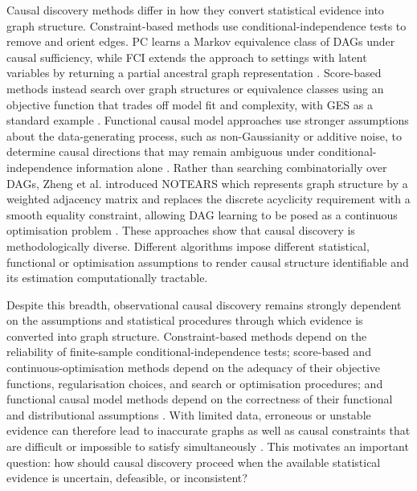 Causal discovery methods differ in how they convert statistical evidence into graph structure. Constraint-based methods use conditional-independence tests to remove and orient edges. PC learns a Markov equivalence class of DAGs under causal sufficiency, while FCI extends the approach to settings with latent variables by returning a partial ancestral graph representation \cite{spirtes2000causation, glymour2019review, colombo2014order}. Score-based methods instead search over graph structures or equivalence classes using an objective function that trades off model fit and complexity, with GES as a standard example \cite{meek1997graphical, chickering2002optimal}. Functional causal model approaches use stronger assumptions about the data-generating process, such as non-Gaussianity or additive noise, to determine causal directions that may remain ambiguous under conditional-independence information alone \cite{shimizu2006linear, hoyer2008nonlinear, peters2014causal}. Rather than searching combinatorially over DAGs, Zheng et al. introduced NOTEARS which represents graph structure by a weighted adjacency matrix and replaces the discrete acyclicity requirement with a smooth equality constraint, allowing DAG learning to be posed as a continuous optimisation problem \cite{zheng2018dags}. These approaches show that causal discovery is methodologically diverse. Different algorithms impose different statistical, functional or optimisation assumptions to render causal structure identifiable and its estimation computationally tractable.

Despite this breadth, observational causal discovery remains strongly dependent on the assumptions and statistical procedures through which evidence is converted into graph structure. Constraint-based methods depend on the reliability of finite-sample conditional-independence tests; score-based and continuous-optimisation methods depend on the adequacy of their objective functions, regularisation choices, and search or optimisation procedures; and functional causal model methods depend on the correctness of their functional and distributional assumptions \cite{glymour2019review}. With limited data, erroneous or unstable evidence can therefore lead to inaccurate graphs as well as causal constraints that are difficult or impossible to satisfy simultaneously \cite{russo2024argumentative}. This motivates an important question: how should causal discovery proceed when the available statistical evidence is uncertain, defeasible, or inconsistent?

